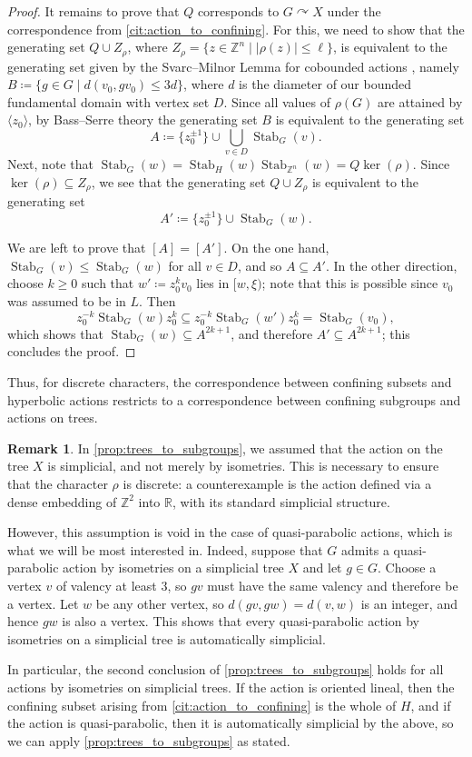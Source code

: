 \documentclass[reqno,12pt]{amsart}\setcounter{tocdepth}{1}
\theoremstyle{definition}
\newtheorem{remark}[theorem]{Remark}
\newcommand{\Z}{\mathbb{Z}}
\newcommand{\R}{\mathbb{R}}
\DeclareMathOperator{\Stab}{Stab}
\numberwithin{equation}{section}
\begin{document}
\begin{proof}
It remains to prove that $Q$ corresponds to $G\curvearrowright X$ under the correspondence from \cref{cit:action_to_confining}. For this, we need to show that the generating set $Q \cup Z_\rho$, where $Z_\rho = \{ z \in \Z^n \mid |\rho(z)| \leq \ell \}$, is equivalent to the generating set given by the Svarc--Milnor Lemma for cobounded actions \cite[Lemma 3.11]{ABO}, namely $B \coloneqq \{ g \in G \mid d(v_0, gv_0) \leq 3d \}$, where $d$ is the diameter of our bounded fundamental domain with vertex set $D$. Since all values of $\rho(G)$ are attained by $\langle z_0 \rangle$, by Bass--Serre theory the generating set $B$ is equivalent to the generating set
\[A \coloneqq \{ z_0^{\pm 1} \} \cup \bigcup_{v\in D} \Stab_G(v).\]
Next, note that $\Stab_G(w) = \Stab_H(w) \Stab_{\Z^n}(w) = Q \ker(\rho)$. Since $\ker(\rho) \subseteq Z_\rho$, we see that the generating set $Q \cup Z_\rho$ is equivalent to the generating set
\[A' \coloneqq \{z_0^{\pm 1}\}\cup \Stab_G(w).\]

We are left to prove that $[A] = [A']$. On the one hand, $\Stab_G(v) \leq \Stab_G(w)$ for all $v\in D$, and so $A \subseteq A'$. In the other direction, choose $k \geq 0$ such that $w' \coloneqq z_0^k v_0$ lies in $[w,\xi)$; note that this is possible since $v_0$ was assumed to be in $L$. Then
\[z_0^{-k} \Stab_G(w) z_0^k \subseteq z_0^{-k} \Stab_G(w') z_0^k = \Stab_G(v_0),\]
which shows that $\Stab_G(w) \subseteq A^{2k+1}$, and therefore $A' \subseteq A^{2k+1}$; this concludes the proof.
\end{proof}

Thus, for discrete characters, the correspondence between confining subsets and hyperbolic actions restricts to a correspondence between confining subgroups and actions on trees.

\begin{remark}
\label{rem:simplicial}
    In \cref{prop:trees_to_subgroups}, we assumed that the action on the tree $X$ is simplicial, and not merely by isometries. This is necessary to ensure that the character $\rho$ is discrete: a counterexample is the action defined via a dense embedding of $\Z^2$ into $\R$, with its standard simplicial structure.

    However, this assumption is void in the case of quasi-parabolic actions, which is what we will be most interested in. Indeed, suppose that $G$ admits a quasi-parabolic action by isometries on a simplicial tree $X$ and let $g \in G$. Choose a vertex $v$ of valency at least $3$, so $gv$ must have the same valency and therefore be a vertex. Let $w$ be any other vertex, so $d(gv, gw) = d(v, w)$ is an integer, and hence $gw$ is also a vertex. This shows that every quasi-parabolic action by isometries on a simplicial tree is automatically simplicial.

    In particular, the second conclusion of \cref{prop:trees_to_subgroups} holds for all actions by isometries on simplicial trees. If the action is oriented lineal, then the confining subset arising from \cref{cit:action_to_confining} is the whole of $H$, and if the action is quasi-parabolic, then it is automatically simplicial by the above, so we can apply \cref{prop:trees_to_subgroups} as stated.
\end{remark}
\end{document}
